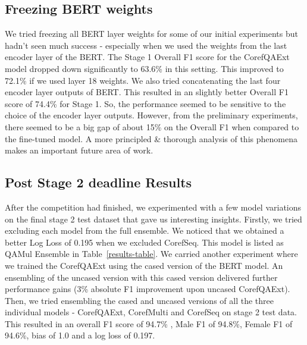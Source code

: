\documentclass[11pt,a4paper]{article}
\begin{document}
\subsection{Freezing BERT weights}
We tried freezing all BERT layer weights for some of our initial experiments but hadn't seen much success - especially when we used the weights from the last encoder layer of the BERT. The Stage 1 Overall F1 score for the CorefQAExt model dropped down significantly to 63.6\% in this setting. This improved to 72.1\% if we used layer 18 weights. We also tried concatenating the last four encoder layer outputs of BERT. This resulted in an slightly better Overall F1 score of 74.4\% for Stage 1. So, the performance seemed to be sensitive to the choice of the encoder layer outputs. However, from the preliminary experiments, there seemed to be a big gap of about 15\% on the Overall F1 when compared to the fine-tuned model. A more principled \& thorough analysis of this phenomena makes an important future area of work.

\subsection{Post Stage 2 deadline Results}
After the competition had finished, we experimented with a few model variations on the final stage 2 test dataset that gave us interesting insights. Firstly, we tried excluding each model from the full ensemble. We noticed that we obtained a better Log Loss of 0.195 when we excluded CorefSeq. This model is listed as QAMul Ensemble in Table~\ref{results-table}. We carried another experiment where we trained the CorefQAExt using the cased version of the BERT model. An ensembling of the uncased version with this cased version delivered further performance gains (3\% absolute F1 improvement upon uncased CorefQAExt). Then, we tried ensembling the cased and uncased versions of all the three individual models - CorefQAExt, CorefMulti and CorefSeq on stage 2 test data. This resulted in an overall F1 score of 94.7\% , Male F1 of 94.8\%, Female F1 of 94.6\%, bias of 1.0 and a log loss of 0.197.
\end{document}
